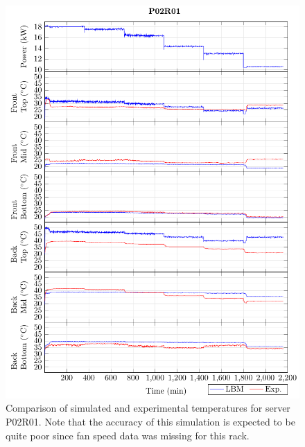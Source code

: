 \clearpage

\begin{figure}[!htb]
\centering
\includegraphics[width=\linewidth]{Plots/P02R01_T.pdf}
\caption{Comparison of simulated and experimental temperatures for server P02R01. Note that the accuracy of this simulation is expected to be quite poor since fan speed data was missing for this rack.}
\label{fig:P02R01_plot}
\end{figure}

\clearpage

